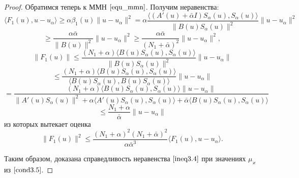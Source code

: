 \begin{proof}
Обратимся теперь к ММН $\eqref{equ_mmn}$. Получим неравенства:
$$\langle F_1(u), u-u_\alpha\rangle\ge\alpha\beta_1(u)\|u-u_\alpha\|^2= \alpha\frac{\langle (A'(u)+\bar\alpha I)S_\alpha (u),S_\alpha (u)\rangle }{\|B(u)S_\alpha (u)\|^2}\|u-u_\alpha\|^2$$
\begin{equation}\label{ineq3.11}
\ge\frac{\alpha\bar\alpha}{\|B(u)\|^2}\|u-u_\alpha\|^2\ge\frac{\alpha\bar\alpha}{(N_1+\bar\alpha)^2}\|u-u_\alpha\|^2,
\end{equation}
$$\|F_1(u)\|\le\frac{(N_1+\alpha)\langle B(u)S_\alpha (u),S_\alpha (u)\rangle }{\|B(u)S_\alpha (u)\|^2}\|u-u_\alpha\|$$
$$\le\frac{(N_1+\alpha)\langle B(u)S_\alpha (u),S_\alpha (u)\rangle }{\langle B(u)S_\alpha (u), B(u)S_\alpha (u)\rangle }\|u-u_\alpha\|$$ 
$$=\frac{(N_1+\alpha)\langle B(u)S_\alpha (u),S_\alpha (u)\rangle \|u-u_\alpha\|}{\|A'(u)S_\alpha (u)\|^2+\alpha\langle A'(u)S_\alpha (u),S_\alpha (u)\rangle +\bar\alpha\langle B(u)S_\alpha (u), S_\alpha (u)\rangle }$$
\begin{equation}\label{ineq3.12}
\le\frac{N_1+\alpha}{\bar\alpha}\|u-u_\alpha\|
\end{equation}
из которых вытекает оценка
$$\|F_1(u)\|^2\le\frac{(N_1+\alpha)^2(N_1+\bar\alpha)^2}{\alpha\bar\alpha^3}\langle F_1(u), u-u_\alpha\rangle.$$

Таким образом, доказана справедливость неравенства $\eqref{ineq3.4}$ при значениях $\mu_\varkappa$ из $\eqref{cond3.5}$.
\end{proof}

